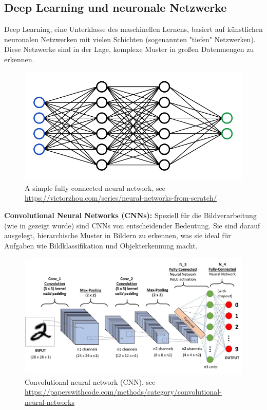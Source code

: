 \documentclass[nolibertine, ngerman, algorithm, nomencl, minted]{ttlab-qualify}
\begin{document}
\subsection{Deep Learning und neuronale Netzwerke}

Deep Learning, eine Unterklasse des maschinellen Lernens, basiert auf künstlichen neuronalen Netzwerken mit vielen Schichten (sogenannten "tiefen" Netzwerken). Diese Netzwerke sind in der Lage, komplexe Muster in großen Datenmengen zu erkennen.

\begin{figure}[h]
	\centering
	\includegraphics[scale=0.4]{static/FCnetwork.png}
	\caption{A simple fully connected neural network, see \url{https://victorzhou.com/series/neural-networks-from-scratch/}}
	\label{fig:2.1}
\end{figure}

\textbf{Convolutional Neural Networks (CNNs):} Speziell für die Bildverarbeitung (wie in \cite{oshea2015introduction} gezeigt wurde) sind CNNs von entscheidender Bedeutung. Sie sind darauf ausgelegt, hierarchische Muster in Bildern zu erkennen, was sie ideal für Aufgaben wie Bildklassifikation und Objekterkennung macht.
\begin{figure}[h]
	\centering
	\includegraphics[scale=0.2]{static/cnn.jpeg}
	\caption{Convolutional neural network (CNN), see \url{https://paperswithcode.com/methods/category/convolutional-neural-networks}}
	\label{fig:2.2}
\end{figure}
\end{document}
